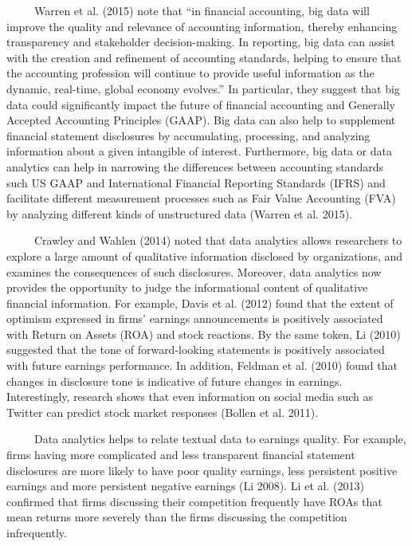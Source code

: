 \documentclass[
  letterpaper,
  DIV=11,
  numbers=noendperiod]{scrreprt}
\begin{document}
~~~~~Warren et al. (2015) note that ``in financial accounting, big data
will improve the quality and relevance of accounting information,
thereby enhancing transparency and stakeholder decision-making. In
reporting, big data can assist with the creation and refinement of
accounting standards, helping to ensure that the accounting profession
will continue to provide useful information as the dynamic, real-time,
global economy evolves.'' In particular, they suggest that big data
could significantly impact the future of financial accounting and
Generally Accepted Accounting Principles (GAAP). Big data can also help
to supplement financial statement disclosures by accumulating,
processing, and analyzing information about a given intangible of
interest. Furthermore, big data or data analytics can help in narrowing
the differences between accounting standards such US GAAP and
International Financial Reporting Standards (IFRS) and facilitate
different measurement processes such as Fair Value Accounting (FVA) by
analyzing different kinds of unstructured data (Warren et al. 2015).

~~~~~Crawley and Wahlen (2014) noted that data analytics allows
researchers to explore a large amount of qualitative information
disclosed by organizations, and examines the consequences of such
disclosures. Moreover, data analytics now provides the opportunity to
judge the informational content of qualitative financial information.
For example, Davis et al. (2012) found that the extent of optimism
expressed in firms' earnings announcements is positively associated with
Return on Assets (ROA) and stock reactions. By the same token, Li (2010)
suggested that the tone of forward-looking statements is positively
associated with future earnings performance. In addition, Feldman et al.
(2010) found that changes in disclosure tone is indicative of future
changes in earnings. Interestingly, research shows that even information
on social media such as Twitter can predict stock market responses
(Bollen et al. 2011).

~~~~~Data analytics helps to relate textual data to earnings quality.
For example, firms having more complicated and less transparent
financial statement disclosures are more likely to have poor quality
earnings, less persistent positive earnings and more persistent negative
earnings (Li 2008). Li et al. (2013) confirmed that firms discussing
their competition frequently have ROAs that mean returns more severely
than the firms discussing the competition infrequently.
\end{document}

